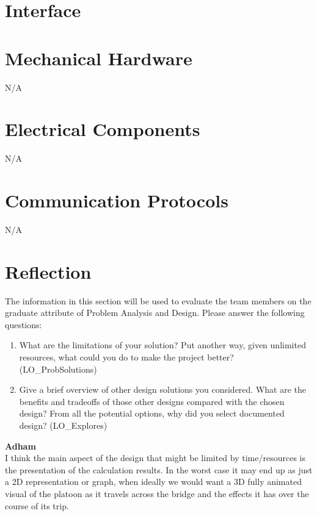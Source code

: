 \documentclass[12pt, titlepage]{article}
\begin{document}
% 

\newpage{}

\appendix

\section{Interface}


\section{Mechanical Hardware}
N/A
\section{Electrical Components}
N/A
\section{Communication Protocols}
N/A
\section{Reflection}

The information in this section will be used to evaluate the team members on the
graduate attribute of Problem Analysis and Design.  Please answer the following questions:

\begin{enumerate}
  \item What are the limitations of your solution?  Put another way, given
  unlimited resources, what could you do to make the project better? (LO\_ProbSolutions)
  \item Give a brief overview of other design solutions you considered.  What
  are the benefits and tradeoffs of those other designs compared with the chosen
  design?  From all the potential options, why did you select documented design?
  (LO\_Explores)
\end{enumerate}

\noindent\textbf{Adham}\\
I think the main aspect of the design that might be limited by time/resources is the presentation of the calculation results. In the worst case it may end up as just a 2D
representation or graph, when ideally we would want a 3D fully animated visual of the platoon as it travels across the bridge and the effects it has over the course of its
trip.\\
\end{document}
